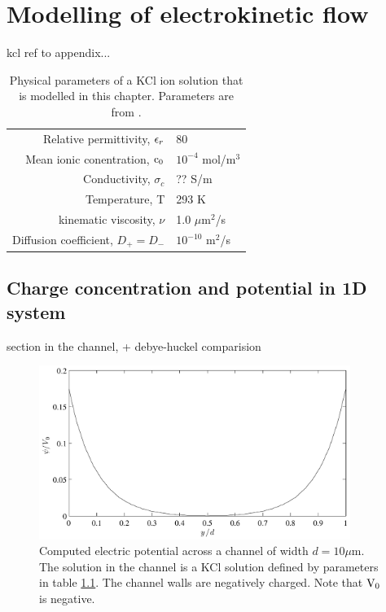 \chapter{Modelling of electrokinetic flow}
kcl ref to appendix...
\begin{table}
  \caption{Physical parameters of a KCl ion solution that is modelled
    in this chapter. Parameters are from \cite{dongquing-ren-book}. }
\begin{center}
    \begin{tabular}{ | r | l |}
    \hline
    Relative permittivity, $\epsilon_r$ & 80\\
    Mean ionic conentration, $\mathrm{c_0}$ & $10^{-4}$ mol/m$^3$\\
    Conductivity, $\sigma_c$ & ?? S/m\\
    Temperature, T & 293 K\\
    kinematic viscosity, $\nu$ & 1.0 $\mu$m$^2$/s\\
    Diffusion coefficient, $D_+ = D_{-}$ & $ 10^{-10}$ m$^2$/s\\
    \hline
    \end{tabular}
\end{center}    
\label{tab:res:param}
\end{table}

\section{Charge concentration and potential in 1D system}
section in the channel, + debye-huckel comparision

\begin{figure}
\begin{center}
\includegraphics[width=0.9\textwidth]{fig/potential_1d.pdf}
\end{center}
\caption{Computed electric potential across a channel of width $d = 10
  \mu$m. The solution in the channel is a KCl solution defined by
  parameters in table \ref{tab:res:param}. The channel walls are
  negatively charged. Note that $\mathrm{V_0}$ is negative.}
\label{fig:res:pot_1d}
\end{figure}

